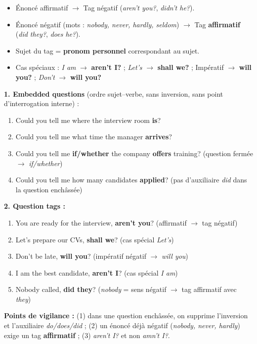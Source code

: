 \documentclass[11pt]{article}
\begin{document}
\begin{aretenir}
\begin{itemize}
    \item Énoncé affirmatif $\rightarrow$ Tag négatif (\emph{aren't you?}, \emph{didn't he?}).
    \item Énoncé négatif (mots : \emph{nobody, never, hardly, seldom}) $\rightarrow$ Tag \textbf{affirmatif} (\emph{did they?}, \emph{does he?}).
    \item Sujet du tag = \textbf{pronom personnel} correspondant au sujet.
    \item Cas spéciaux : \emph{I am} $\rightarrow$ \textbf{aren't I?} ; \emph{Let's} $\rightarrow$ \textbf{shall we?} ; Impératif $\rightarrow$ \textbf{will you?} ; \emph{Don't} $\rightarrow$ \textbf{will you?}
\end{itemize}
\end{aretenir}

\begin{corrige}
\textbf{1. Embedded questions} (ordre sujet--verbe, sans inversion, sans point d'interrogation interne) :
\begin{enumerate}
    \item[a)] Could you tell me where the interview room \textbf{is}?
    \item[b)] Could you tell me what time the manager \textbf{arrives}?
    \item[c)] Could you tell me \textbf{if/whether} the company \textbf{offers} training? (question fermée $\rightarrow$ \emph{if/whether})
    \item[d)] Could you tell me how many candidates \textbf{applied}? (pas d'auxiliaire \emph{did} dans la question enchâssée)
\end{enumerate}
\textbf{2. Question tags :}
\begin{enumerate}
    \item[a)] You are ready for the interview, \textbf{aren't you}? (affirmatif $\rightarrow$ tag négatif)
    \item[b)] Let's prepare our CVs, \textbf{shall we}? (cas spécial \emph{Let's})
    \item[c)] Don't be late, \textbf{will you}? (impératif négatif $\rightarrow$ \emph{will you})
    \item[d)] I am the best candidate, \textbf{aren't I}? (cas spécial \emph{I am})
    \item[e)] Nobody called, \textbf{did they}? (\emph{nobody} = sens négatif $\rightarrow$ tag affirmatif avec \emph{they})
\end{enumerate}
\textbf{Points de vigilance :} (1) dans une question enchâssée, on supprime l'inversion et l'auxiliaire \emph{do/does/did} ; (2) un énoncé déjà négatif (\emph{nobody, never, hardly}) exige un tag \textbf{affirmatif} ; (3) \emph{aren't I?} et non \emph{amn't I?}.
\end{corrige}
\end{document}
